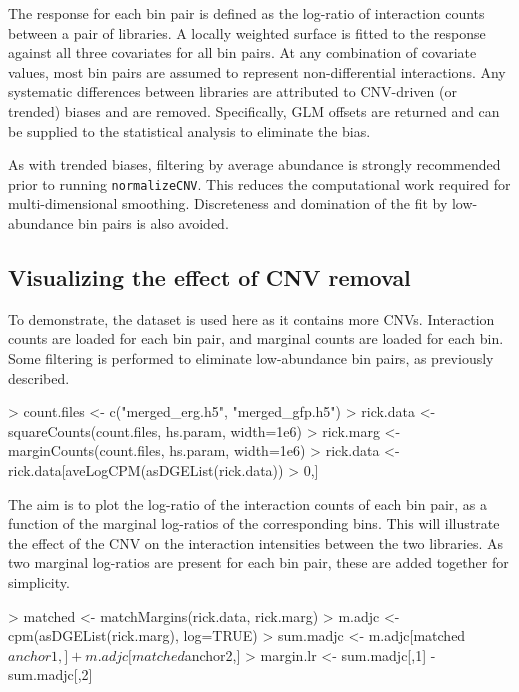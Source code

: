 \documentclass[12pt]{report}
\renewenvironment{Schunk}{\vspace{0pt}}{\vspace{0pt}}
\newcommand{\code}[1]{{\small\texttt{#1}}}
\begin{document}
The response for each bin pair is defined as the log-ratio of interaction counts between a pair of  libraries.
A locally weighted surface is fitted to the response against all three covariates for all bin pairs.
At any combination of covariate values, most bin pairs are assumed to represent non-differential interactions.
Any systematic differences between libraries are attributed to CNV-driven (or trended) biases and are removed.
Specifically, GLM offsets are returned and can be supplied to the statistical analysis to eliminate the bias.

As with trended biases, filtering by average abundance is strongly recommended prior to running \code{normalizeCNV}.
This reduces the computational work required for multi-dimensional smoothing.
Discreteness and domination of the fit by low-abundance bin pairs is also avoided.

\subsection{Visualizing the effect of CNV removal}
To demonstrate, the \citeauthor{rickman2012oncogene} dataset is used here as it contains more CNVs.
Interaction counts are loaded for each bin pair, and marginal counts are loaded for each bin.
Some filtering is performed to eliminate low-abundance bin pairs, as previously described.

\begin{Schunk}
\begin{Sinput}
> count.files <- c("merged_erg.h5", "merged_gfp.h5")
> rick.data <- squareCounts(count.files, hs.param, width=1e6)
> rick.marg <- marginCounts(count.files, hs.param, width=1e6)
> rick.data <- rick.data[aveLogCPM(asDGEList(rick.data)) > 0,]
\end{Sinput}
\end{Schunk}

The aim is to plot the log-ratio of the interaction counts of each bin pair, as a function of the marginal log-ratios of the corresponding bins.
This will illustrate the effect of the CNV on the interaction intensities between the two libraries.
As two marginal log-ratios are present for each bin pair, these are added together for simplicity.

\begin{Schunk}
\begin{Sinput}
> matched <- matchMargins(rick.data, rick.marg)
> m.adjc <- cpm(asDGEList(rick.marg), log=TRUE)
> sum.madjc <- m.adjc[matched$anchor1,] + m.adjc[matched$anchor2,]
> margin.lr <- sum.madjc[,1] - sum.madjc[,2]
\end{Sinput}
\end{Schunk}
\end{document}
